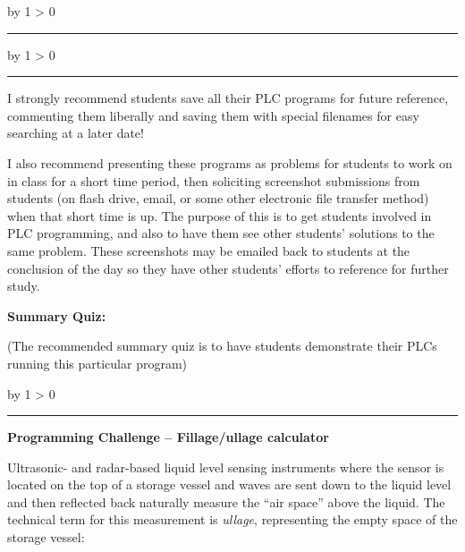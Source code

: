 \documentclass[12pt,a4paper]{article}
\def\oppgave{
            \advance\questnum by 1
            \ifnum \questnum > 0
                 \hrule
                 \vskip 3pt
                 \leftline{Oppgave \the\questnum}
                 \vskip 3pt \fi}
\def\svar{
           \advance\answnum by 1
           \ifnum \answnum > 0
                \hrule
                \vskip 3pt
                \leftline{Svar \the\answnum}
                \vskip 3pt \fi}
\def\notes{
           \advance\explnum by 1
           \ifnum \explnum > 0
                \hrule
                \vskip 3pt
                \leftline{Notes \the\explnum}
                \vskip 3pt \fi}
\begin{document}
\eject
\vskip 10pt \filbreak 





\svar{} 


\vskip 10pt \filbreak 





\notes{} 

I strongly recommend students save all their PLC programs for future reference, commenting them liberally and saving them with special filenames for easy searching at a later date!

\vskip 10pt

I also recommend presenting these programs as problems for students to work on in class for a short time period, then soliciting screenshot submissions from students (on flash drive, email, or some other electronic file transfer method) when that short time is up.  The purpose of this is to get students involved in PLC programming, and also to have them see other students' solutions to the same problem.  These screenshots may be emailed back to students at the conclusion of the day so they have other students' efforts to reference for further study.

\vfil \eject

\noindent
{\bf Summary Quiz:}

(The recommended summary quiz is to have students demonstrate their PLCs running this particular program)


\vfil \eject 



\oppgave{} 

\noindent
{\bf Programming Challenge -- Fillage/ullage calculator} 

\vskip 10pt

Ultrasonic- and radar-based liquid level sensing instruments where the sensor is located on the top of a storage vessel and waves are sent down to the liquid level and then reflected back naturally measure the ``air space'' above the liquid.  The technical term for this measurement is {\it ullage}, representing the empty space of the storage vessel:
\end{document}
